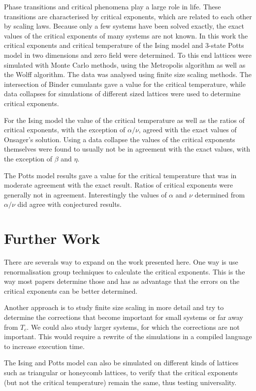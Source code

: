 \documentclass[11pt, a4paper]{report} %
\begin{document}
Phase transitions and critical phenomena play a large role in life.
These transitions are characterised by critical exponents, which are related to each other by scaling laws.
Because only a few systems have been solved exactly, the exact values of the critical exponents of many systems are not known.
In this work the critical exponents and critical temperature of the Ising model and 3-state Potts model in two dimensions and zero field were determined.
To this end lattices were simulated with Monte Carlo methods, using the Metropolis algorithm as well as the Wolff algorithm.
The data was analysed using finite size scaling methods.
The intersection of Binder cumulants gave a value for the critical temperature, while data collapses for simulations of different sized lattices were used to determine critical exponents.

For the Ising model the value of the critical temperature as well as the ratios of critical exponents, with the exception of \(\alpha/\nu\), agreed with the exact values of Onsager's solution.
Using a data collapse the values of the critical exponents themselves were found to usually not be in agreement with the exact values, with the exception of \(\beta\) and \(\eta\).

The Potts model results gave a value for the critical temperature that was in moderate agreement with the exact result.
Ratios of critical exponents were generally not in agreement.
Interestingly the values of \(\alpha\) and \(\nu\) determined from \(\alpha /\nu\) did agree with conjectured results.


\section{Further Work}
There are severals way to expand on the work presented here.
One way is use renormalisation group techniques to calculate the critical exponents.
This is the way most papers determine those and has as advantage that the errors on the critical exponents can be better determined.

Another approach is to study finite size scaling in more detail and try to determine the corrections that become important for small systems or far away from \(T_c\).
We could also study larger systems, for which the corrections are not important.
This would require a rewrite of the simulations in a compiled language to increase execution time.

The Ising and Potts model can also be simulated on different kinds of lattices such as triangular or honeycomb lattices, to verify that the critical exponents (but not the critical temperature) remain the same, thus testing universality.
\end{document}
